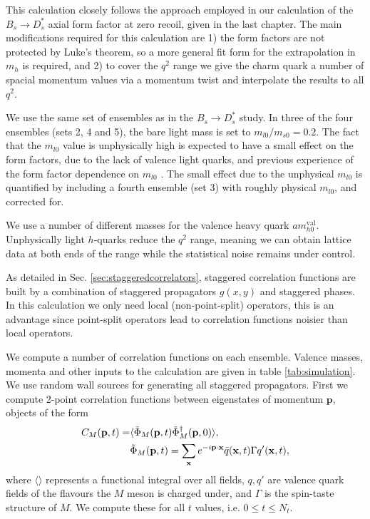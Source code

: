 This calculation closely follows the approach employed in our calculation of the $B_s\to D_s^*$ axial form factor at zero recoil, given in the last chapter. The main modifications required for this calculation are 1) the form factors are not protected by Luke's theorem, so a more general fit form for the extrapolation in $m_h$ is required, and 2) to cover the $q^2$ range we give the charm quark a number of spacial momentum values via a momentum twist and interpolate the results to all $q^2$.

We use the same set of ensembles as in the $B_s\to D_s^*$ study. In three of the four ensembles (sets 2, 4 and 5), the bare light mass is set to $m_{l0}/m_{s0} = 0.2$. The fact that the $m_{l0}$ value is unphysically high is expected to have a small effect on the form factors, due to the lack of valence light quarks, and previous experience of the form factor dependence on $m_{l0}$ \cite{Monahan:2017uby}. The small effect due to the unphysical $m_{l0}$ is quantified by including a fourth ensemble (set 3) with roughly physical $m_{l0}$, and corrected for. 

We use a number of different masses for the valence heavy quark $am_{h0}^{\text{val}}$. Unphysically light $h$-quarks reduce the $q^2$ range, meaning we can obtain lattice data at both ends of the range while the statistical noise remains under control.

As detailed in Sec. \ref{sec:staggeredcorrelators}, staggered correlation functions are built by a combination of staggered propagators $g(x,y)$ and staggered phases. In this calculation we only need local (non-point-split) operators, this is an advantage since point-split operators lead to correlation functions noisier than local operators.

We compute a number of correlation functions on each ensemble. Valence masses, momenta and other inputs to the calculation are given in table \ref{tab:simulation}. We use random wall sources for generating all staggered propagators. First we compute 2-point correlation functions between eigenstates of momentum ${\textbf{p}}$, objects of the form
\begin{align}
  C_{M}({\textbf{p}},t) =& \langle \tilde{\Phi}_M ({\bf{p}},t) \tilde{\Phi}_M^{\dagger}({\bf{p}},0) \rangle, \\ 
  &\tilde{\Phi}_M({\bf{p}},t) = \sum_{{\bf{x}}} e^{-i\bf{p}\cdot \bf{x}} \bar{q}({\bf{x}},t) \Gamma q'({\bf{x}},t), \nonumber
\end{align}
where $\langle \rangle$ represents a functional integral over all fields, $q,q'$ are valence quark fields of the flavours the $M$ meson is charged under, and $\Gamma$ is the spin-taste structure of $M$. We compute these for all $t$ values, i.e. $0\leq t \leq N_t$.

